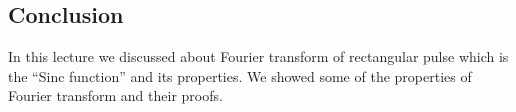 \subsection {Conclusion} In this lecture we discussed about Fourier transform of rectangular pulse which is the ``Sinc function'' and its properties. We showed some of the properties of Fourier transform and their proofs.






